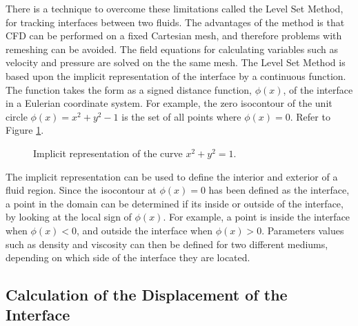 There is a technique to overcome these limitations called the Level Set Method, for tracking interfaces between two fluids. The advantages of the method is that CFD can be performed on a fixed Cartesian mesh, and therefore problems with remeshing can be avoided. The field equations for calculating variables such as velocity and pressure are solved on the the same mesh. The Level Set Method is based upon the implicit representation of the interface by a continuous function. The function takes the form as a signed distance function, $\phi(x)$, of the interface in a Eulerian coordinate system. For example, the zero isocontour of the unit circle $\phi(x)=x^2 + y^2 -1$ is the set of all points where $\phi(x)=0$. Refer to Figure \ref{UNITCIRCLE}.
%
\begin{figure}
\center
{}
\caption{Implicit representation of the curve $x^2 + y^2 = 1$.}
\label{UNITCIRCLE}
\end{figure}
%
The implicit representation can be used to define the interior and exterior of a fluid region. Since the isocontour at $\phi(x)=0$ has been defined as the interface, a point in the domain can be determined if its inside or outside of the interface, by looking at the local sign of $\phi(x)$. For example, a point is inside the interface when $\phi(x)<0$, and outside the interface when $\phi(x)>0$. Parameters values such as density and viscosity can then be defined for two different mediums, depending on which side of the interface they are located.


\subsection{Calculation of the Displacement of the Interface}

